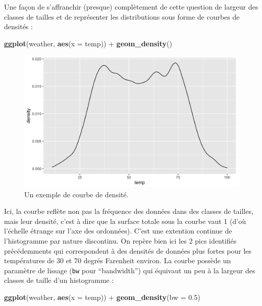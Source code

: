 \documentclass[
  a4paper,
]{article}
\newenvironment{Shaded}{\begin{snugshade}}{\end{snugshade}}
\newcommand{\DataTypeTok}[1]{\textcolor[rgb]{0.00,0.34,0.68}{#1}}
\newcommand{\FloatTok}[1]{\textcolor[rgb]{0.69,0.50,0.00}{#1}}
\newcommand{\KeywordTok}[1]{\textcolor[rgb]{0.12,0.11,0.11}{\textbf{#1}}}
\newcommand{\NormalTok}[1]{\textcolor[rgb]{0.12,0.11,0.11}{#1}}
\newcommand{\OperatorTok}[1]{\textcolor[rgb]{0.12,0.11,0.11}{#1}}
\newcommand{\StringTok}[1]{\textcolor[rgb]{0.75,0.01,0.01}{#1}}
\begin{document}
Une façon de s'affranchir (presque) complètement de cette question de largeur des classes de tailles et de représenter les distributions sous forme de courbes de densités :

\begin{Shaded}
\begin{Highlighting}[]
\KeywordTok{ggplot}\NormalTok{(weather, }\KeywordTok{aes}\NormalTok{(}\DataTypeTok{x =}\NormalTok{ temp)) }\OperatorTok{+}
\StringTok{  }\KeywordTok{geom_density}\NormalTok{()}
\end{Highlighting}
\end{Shaded}

\begin{figure}[htpb]

{\centering \includegraphics[width=0.9\linewidth]{figure/density-1} 

}

\caption{Un exemple de courbe de densité.}\label{fig:density}
\end{figure}

Ici, la courbe reflète non pas la fréquence des données dans des classes de tailles, mais leur densité, c'est à dire que la surface totale sous la courbe vaut 1 (d'où l'échelle étrange sur l'axe des ordonnées). C'est une extention continue de l'histogramme par nature discontinu. On repère bien ici les 2 pics identifiés précédemments qui correspondent à des densités de données plus fortes pour les températures de 30 et 70 degrés Farenheit environ.
La courbe possède un paramètre de lissage (\texttt{bw} pour ``bandwidth'') qui équivaut un peu à la largeur des classes de taille d'un histogramme :

\begin{Shaded}
\begin{Highlighting}[]
\KeywordTok{ggplot}\NormalTok{(weather, }\KeywordTok{aes}\NormalTok{(}\DataTypeTok{x =}\NormalTok{ temp)) }\OperatorTok{+}
\StringTok{  }\KeywordTok{geom_density}\NormalTok{(}\DataTypeTok{bw =} \FloatTok{0.5}\NormalTok{)}
\end{Highlighting}
\end{Shaded}
\end{document}
